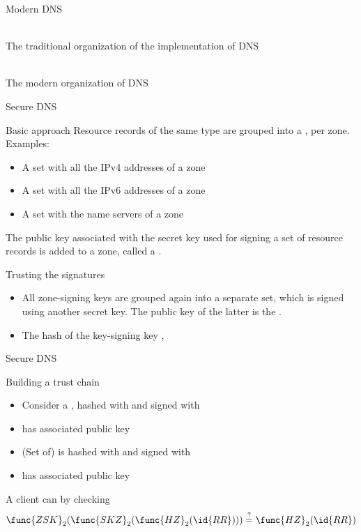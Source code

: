 \begin{slide}{Modern DNS}
  \begin{centerfig}
     \\
    The traditional organization of the implementation of DNS \\ 
  \end{centerfig}
  \vspace*{12pt}
  \begin{centerfig}
     \\
    The modern organization of DNS
  \end{centerfig}
\end{slide}
\begin{slide}{Secure DNS}
  \begin{block}{Basic approach}
    Resource records of the same type are grouped into a , per zone. Examples:
    \begin{itemize}\tightlist
    \item A set with all the IPv4 addresses of a zone
    \item A set with all the IPv6 addresses of a zone
    \item A set with the name servers of a zone
    \end{itemize}
    The public key associated with the secret key used for signing a set of resource records is added to a
    zone, called a . 
  \end{block}
  \begin{block}{Trusting the signatures}
    \begin{itemize}
    \item All zone-signing keys are grouped again into a separate set, which is signed using another secret
      key. The public key of the latter is the .
    \item The hash of the key-signing key , 
    \end{itemize}
  \end{block}
\end{slide}
\begin{slide}{Secure DNS}
  \begin{centerfig}
  \end{centerfig}
  \begin{block}{Building a trust chain}
    \begin{itemize}
    \item Consider a , hashed with  and signed with
    \item {} has associated public key 
    \item (Set of)  is hashed with  and signed with 
    \item {} has associated public key 
    \end{itemize}
    A client can   by checking
    \[
    \func{ZSK}_2(\func{SKZ}_2(\func{HZ}_2(\id{RR}))) \stackrel{?}{=} \func{HZ}_2(\id{RR})
    \]
  \end{block}
\end{slide}
